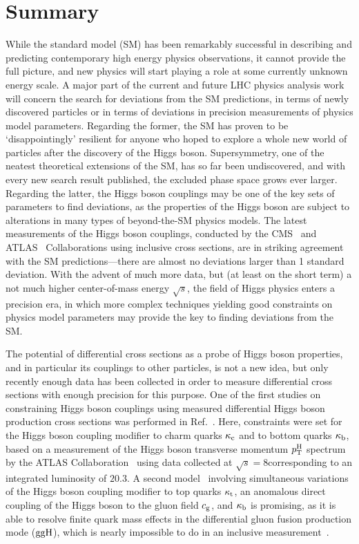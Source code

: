 \section{Summary}

While the standard model (SM) has been remarkably successful in describing and predicting contemporary high energy physics observations, it cannot provide the full picture, and new physics will start playing a role at some currently unknown energy scale.
% 
A major part of the current and future LHC physics analysis work will concern the search for deviations from the SM predictions, in terms of newly discovered particles or in terms of deviations in precision measurements of physics model parameters.
% 
Regarding the former, the SM has proven to be `disappointingly' resilient for anyone who hoped to explore a whole new world of particles after the discovery of the Higgs boson.
% 
Supersymmetry, one of the neatest theoretical extensions of the SM, has so far been undiscovered, and with every new search result published, the excluded phase space grows ever larger.
% 
Regarding the latter, the Higgs boson couplings may be one of the key sets of parameters to find deviations, as the properties of the Higgs boson are subject to alterations in many types of beyond-the-SM physics models.
% 
The latest measurements of the Higgs boson couplings, conducted by the CMS~\cite{Sirunyan:2018koj} and ATLAS~\cite{ATLAS-CONF-2019-005} Collaborations using inclusive cross sections, are in striking agreement with the SM predictions---there are almost no deviations larger than 1 standard deviation.
% 
With the advent of much more data, but (at least on the short term) a not much higher center-of-mass energy $\sqrt{s}$, the field of Higgs physics enters a precision era, in which more complex techniques yielding good constraints on physics model parameters may provide the key to finding deviations from the SM.


The potential of differential cross sections as a probe of Higgs boson properties, and in particular its couplings to other particles, is not a new idea, but only recently enough data has been collected in order to measure differential cross sections with enough precision for this purpose.
% 
One of the first studies on constraining Higgs boson couplings using measured differential Higgs boson production cross sections was performed in Ref.~\cite{Bishara:2016jga}.
% 
Here, constraints were set for the Higgs boson coupling modifier to charm quarks $\kappa_{\mathrm{c}}$ and to bottom quarks $\kappa_{\mathrm{b}}$, based on a measurement of the Higgs boson transverse momentum $p_\mathrm{T}^\mathrm{H}$ spectrum by the ATLAS Collaboration~\cite{Aad:2015lha} using data collected at $\sqrt{s}=8$\TeV corresponding to an integrated luminosity of $20.3$\fbinv.
% 
A second model~\cite{Grazzini:2017szg,Grazzini:2016paz} involving simultaneous variations of the Higgs boson coupling modifier to top quarks $\kappa_{\mathrm{t}}$, an anomalous direct coupling of the Higgs boson to the gluon field $c_\mathrm{g}$, and $\kappa_{\mathrm{b}}$ is promising, as it is able to resolve finite quark mass effects in the differential gluon fusion production mode ($\mathrm{g}\mathrm{g}\mathrm{H}$), which is nearly impossible to do in an inclusive measurement~\cite{Azatov:2013xha}.



